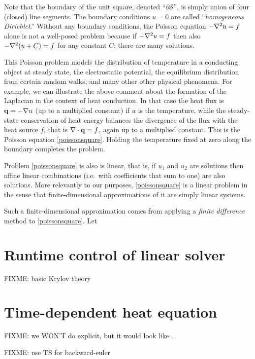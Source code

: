 Note that the boundary of the unit square, denoted ``$\partial\mathcal{S}$'', is simply union of four (closed) line segments.  The boundary conditions $u=0$ are called ``\emph{homogeneous Dirichlet}.''  Without any boundary conditions, the Poisson equation $-\nabla^2 u = f$ alone is not a well-posed problem because if $-\nabla^2 u = f$ then also $-\nabla^2(u+C)=f$ for any constant $C$; there are many solutions.

This Poisson problem models the distribution of temperature in a conducting object at steady state, the electrostatic potential, the equilibrium distribution from certain random walks, and many other other physical phenomena.  For example, we can illustrate the above comment about the formation of the Laplacian in the context of heat conduction.  In that case the heat flux is $\mathbf{q} = - \nabla u$ (up to a multiplied constant) if $u$ is the temperature, while the steady-state conservation of heat energy balances the divergence of the flux with the heat source $f$, that is $\nabla\cdot \mathbf{q} = f$, again up to a multiplied constant.  This is the Poisson equation \eqref{poissonsquare}.  Holding the temperature fixed at zero along the boundary completes the problem.

Problem \eqref{poissonsquare} is also is linear, that is, if $u_1$ and $u_2$ are solutions then affine linear combinations (i.e.~with coefficients that sum to one) are also solutions.  More relevantly to our purposes, \eqref{poissonsquare} is a linear problem in the sense that finite-dimensional approximations of it are simply linear systems.

Such a finite-dimensional approximation comes from applying a \emph{finite difference} method to \eqref{poissonsquare}.  Let





\section{Runtime control of linear solver}

FIXME: basic Krylov theory

\section{Time-dependent heat equation}

FIXME: we WON'T do explicit, but it would look like ...

FIXME: use TS for backward-euler
